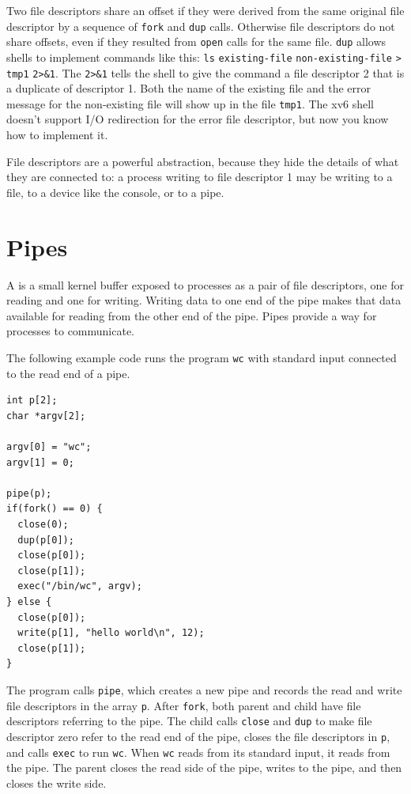 Two file descriptors share an offset if they were derived from
the same original file descriptor by a sequence of
\lstinline{fork}
and
\lstinline{dup}
calls.
Otherwise file descriptors do not share offsets, even if they
resulted from 
\lstinline{open}
calls for the same file.  
\lstinline{dup} 
allows shells to implement commands like this:
\lstinline{ls}
\lstinline{existing-file}
\lstinline{non-existing-file}
\lstinline{>}
\lstinline{tmp1}
\lstinline{2>&1}.
The
\lstinline{2>&1}
tells the shell to give the command a file descriptor 2 that
is a duplicate of descriptor 1.
Both the name of the existing file and the error message for the
non-existing file will show up in the file
\lstinline{tmp1}.
The xv6 shell doesn't support I/O redirection for the error file
descriptor, but now you know how to implement it.

File descriptors are a powerful abstraction,
because they hide the details of what they are connected to:
a process writing to file descriptor 1 may be writing to a
file, to a device like the console, or to a pipe.
\section{Pipes}

A 
is a small kernel buffer exposed to processes as a pair of
file descriptors, one for reading and one for writing.
Writing data to one end of the pipe
makes that data available for reading from the other end of the pipe.
Pipes provide a way for processes to communicate.

The following example code runs the program
\lstinline{wc}
with standard input connected to
the read end of a pipe.
\begin{lstlisting}[]
int p[2];
char *argv[2];

argv[0] = "wc";
argv[1] = 0;

pipe(p);
if(fork() == 0) {
  close(0);
  dup(p[0]);
  close(p[0]);
  close(p[1]);
  exec("/bin/wc", argv);
} else {
  close(p[0]);
  write(p[1], "hello world\n", 12);
  close(p[1]);
}
\end{lstlisting}
The program calls
\lstinline{pipe},
which creates a new pipe and records the read and write
file descriptors in the array
\lstinline{p}.
After
\lstinline{fork},
both parent and child have file descriptors referring to the pipe.
The child calls \lstinline{close} and \lstinline{dup} to make file descriptor
zero refer to the read end of the pipe,
closes the file descriptors in
\lstinline{p},
and calls \lstinline{exec} to run
\lstinline{wc}.
When 
\lstinline{wc}
reads from its standard input, it reads from the pipe.
The parent closes the read side of the pipe,
writes to the pipe,
and then closes the write side.

